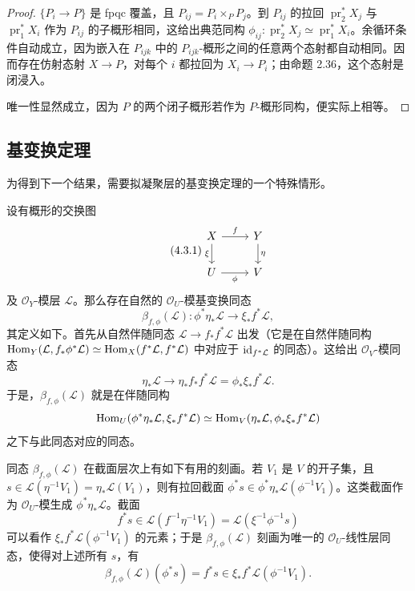 \begin{proof}
$\{P_i\to P\}$ 是 fpqc 覆盖，且 $P_{ij}=P_i\times_P P_j$。到 $P_{ij}$ 的拉回 $\operatorname{pr}_2^*X_j$ 与 $\operatorname{pr}_1^*X_i$ 作为 $P_{ij}$ 的子概形相同，这给出典范同构 $\phi_{ij}\colon\operatorname{pr}_2^*X_j\simeq\operatorname{pr}_1^*X_i$。余循环条件自动成立，因为嵌入在 $P_{ijk}$ 中的 $P_{ijk}$-概形之间的任意两个态射都自动相同。因而存在仿射态射 $X\to P$，对每个 $i$ 都拉回为 $X_i\to P_i$；由命题 2.36，这个态射是闭浸入。

唯一性显然成立，因为 $P$ 的两个闭子概形若作为 $P$-概形同构，便实际上相等。
\end{proof}

\subsection{基变换定理}
为得到下一个结果，需要拟凝聚层的基变换定理的一个特殊情形。

设有概形的交换图
\begin{equation}\tag{4.3.1}\label{ch04:eq431}
\begin{tikzcd}
 X\arrow[r,"{f}"]\arrow[d,"{\xi}"']&Y\arrow[d,"{\eta}"]\\
 U\arrow[r,"{\phi}"']&V
\end{tikzcd}
\end{equation}
及 $\mathcal O_Y$-模层 $\mathcal L$。那么存在自然的 $\mathcal O_U$-模基变换同态
\[
 \beta_{f,\phi}(\mathcal L)\colon\phi^*\eta_*\mathcal L\longrightarrow\xi_*f^*\mathcal L,
\]
其定义如下。首先从自然伴随同态 $\mathcal L\to f_*f^*\mathcal L$ 出发（它是在自然伴随同构 $\operatorname{Hom}_Y(\mathcal L,f_*\phi^*\mathcal L)\simeq\operatorname{Hom}_X(f^*\mathcal L,f^*\mathcal L)$ 中对应于 $\mathrm{id}_{f^*\mathcal L}$ 的同态）。这给出 $\mathcal O_V$-模同态
\[
 \eta_*\mathcal L\longrightarrow\eta_*f_*f^*\mathcal L=\phi_*\xi_*f^*\mathcal L.
\]
于是，$\beta_{f,\phi}(\mathcal L)$ 就是在伴随同构
\[
 \operatorname{Hom}_U(\phi^*\eta_*\mathcal L,\xi_*f^*\mathcal L)
 \simeq\operatorname{Hom}_V(\eta_*\mathcal L,\phi_*\xi_*f^*\mathcal L)
\]
之下与此同态对应的同态。

同态 $\beta_{f,\phi}(\mathcal L)$ 在截面层次上有如下有用的刻画。若 $V_1$ 是 $V$ 的开子集，且 $s\in\mathcal L(\eta^{-1}V_1)=\eta_*\mathcal L(V_1)$，则有拉回截面 $\phi^*s\in\phi^*\eta_*\mathcal L(\phi^{-1}V_1)$。这类截面作为 $\mathcal O_U$-模生成 $\phi^*\eta_*\mathcal L$。截面
\[
 f^*s\in\mathcal L(f^{-1}\eta^{-1}V_1)=\mathcal L(\xi^{-1}\phi^{-1}s)
\]
可以看作 $\xi_*f^*\mathcal L(\phi^{-1}V_1)$ 的元素；于是 $\beta_{f,\phi}(\mathcal L)$ 刻画为唯一的 $\mathcal O_U$-线性层同态，使得对上述所有 $s$，有
\[
 \beta_{f,\phi}(\mathcal L)(\phi^*s)=f^*s\in\xi_*f^*\mathcal L(\phi^{-1}V_1).
\]

